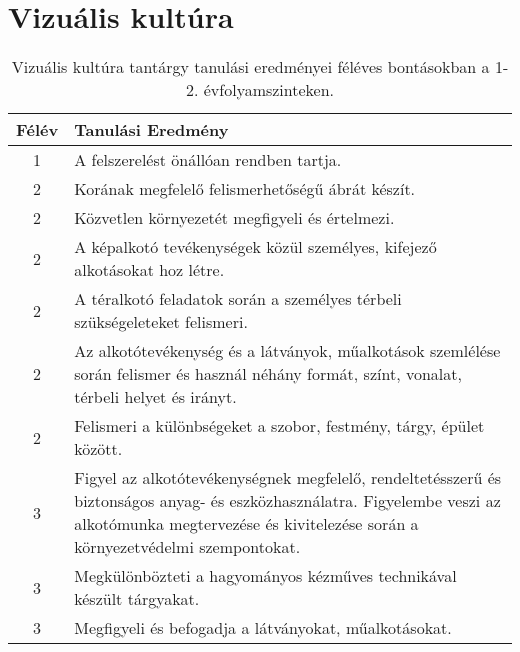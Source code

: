             \clearpage

        \section{Vizuális kultúra}

       
           \begin{longtable}{c | p{12cm} }
            \caption[Vizuális kultúra 1-2.]{Vizuális kultúra tantárgy tanulási eredményei féléves bontásokban a 1-2. évfolyamszinteken. }  \\

            \textbf{Félév} & \textbf{Tanulási Eredmény} \\
            \hline
            \endhead
                                
                                          1 &  A felszerelést önállóan rendben tartja. \\ \hline
                                      
                                
                                          2 &  Korának megfelelő felismerhetőségű ábrát készít. \\ \hline
                                          2 &  Közvetlen környezetét megfigyeli és értelmezi. \\ \hline
                                          2 &  A képalkotó tevékenységek közül személyes, kifejező alkotásokat hoz létre. \\ \hline
                                          2 &  A téralkotó feladatok során a személyes térbeli szükségeleteket felismeri. \\ \hline
                                          2 &  Az alkotótevékenység és a látványok, műalkotások szemlélése során felismer és használ néhány formát, színt, vonalat, térbeli helyet és irányt. \\ \hline
                                          2 &  Felismeri a különbségeket a szobor, festmény, tárgy, épület között. \\ \hline
                                      
                                
                                          3 &  Figyel az alkotótevékenységnek megfelelő, rendeltetésszerű és biztonságos anyag- és eszközhasználatra. Figyelembe veszi az alkotómunka megtervezése és kivitelezése során a környezetvédelmi szempontokat. \\ \hline
                                          3 &  Megkülönbözteti a hagyományos kézműves technikával készült tárgyakat. \\ \hline
                                          3 &  Megfigyeli és befogadja a látványokat, műalkotásokat. \\ \hline
                                      

\end{longtable}
